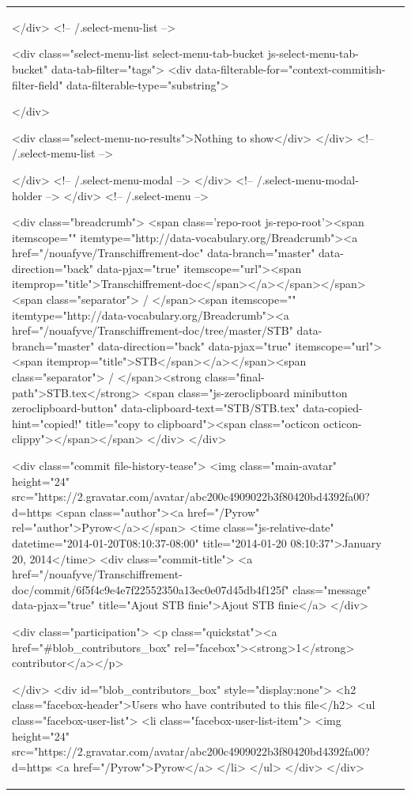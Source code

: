 \documentclass[a4paper,11pt,french]{article}
\begin{document}
\begin{tabular}{|m{8cm}|m{8cm}|}
      </div> <!-- /.select-menu-list -->

      <div class="select-menu-list select-menu-tab-bucket js-select-menu-tab-bucket" data-tab-filter="tags">
        <div data-filterable-for="context-commitish-filter-field" data-filterable-type="substring">


        </div>

        <div class="select-menu-no-results">Nothing to show</div>
      </div> <!-- /.select-menu-list -->

    </div> <!-- /.select-menu-modal -->
  </div> <!-- /.select-menu-modal-holder -->
</div> <!-- /.select-menu -->

  <div class="breadcrumb">
    <span class='repo-root js-repo-root'><span itemscope="" itemtype="http://data-vocabulary.org/Breadcrumb"><a href="/nouafyve/Transchiffrement-doc" data-branch="master" data-direction="back" data-pjax="true" itemscope="url"><span itemprop="title">Transchiffrement-doc</span></a></span></span><span class="separator"> / </span><span itemscope="" itemtype="http://data-vocabulary.org/Breadcrumb"><a href="/nouafyve/Transchiffrement-doc/tree/master/STB" data-branch="master" data-direction="back" data-pjax="true" itemscope="url"><span itemprop="title">STB</span></a></span><span class="separator"> / </span><strong class="final-path">STB.tex</strong> <span class="js-zeroclipboard minibutton zeroclipboard-button" data-clipboard-text="STB/STB.tex" data-copied-hint="copied!" title="copy to clipboard"><span class="octicon octicon-clippy"></span></span>
  </div>
</div>



  <div class="commit file-history-tease">
    <img class="main-avatar" height="24" src="https://2.gravatar.com/avatar/abc200c4909022b3f80420bd4392fa00?d=https%
    <span class="author"><a href="/Pyrow" rel="author">Pyrow</a></span>
    <time class="js-relative-date" datetime="2014-01-20T08:10:37-08:00" title="2014-01-20 08:10:37">January 20, 2014</time>
    <div class="commit-title">
        <a href="/nouafyve/Transchiffrement-doc/commit/6f5f4c9e4e7f22552350a13ec0e07d45db4f125f" class="message" data-pjax="true" title="Ajout STB finie">Ajout STB finie</a>
    </div>

    <div class="participation">
      <p class="quickstat"><a href="#blob_contributors_box" rel="facebox"><strong>1</strong> contributor</a></p>
      
    </div>
    <div id="blob_contributors_box" style="display:none">
      <h2 class="facebox-header">Users who have contributed to this file</h2>
      <ul class="facebox-user-list">
          <li class="facebox-user-list-item">
            <img height="24" src="https://2.gravatar.com/avatar/abc200c4909022b3f80420bd4392fa00?d=https%
            <a href="/Pyrow">Pyrow</a>
          </li>
      </ul>
    </div>
  </div>


\end{tabular}
\end{document}
